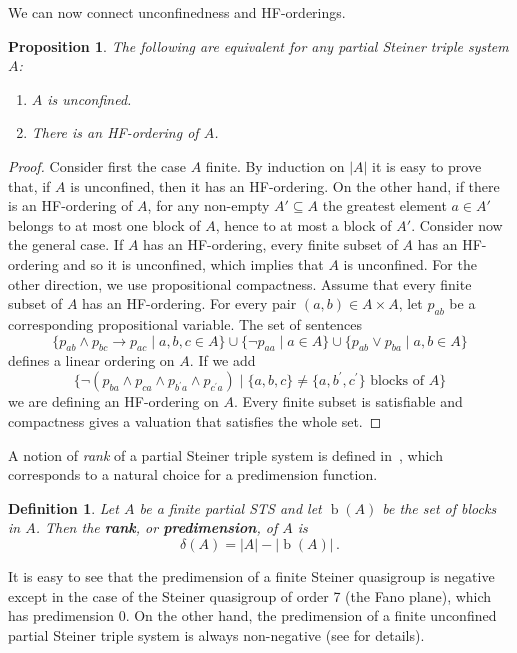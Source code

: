\documentclass[a4paper, 11pt]{article}
\DeclareMathOperator{\bl}{b}
\theoremstyle{note}
\newtheorem{df}[thm]{Definition}
\newtheorem{prop}[thm]{Proposition}
\begin{document}
We can now connect unconfinedness and HF-orderings.
			
\begin{prop}\label{2024_nov3} The following are equivalent for any partial Steiner triple system $A$:
\begin{enumerate}
\item $A$ is unconfined.
\item There is an HF-ordering of $A$.
\end{enumerate}	
\end{prop}	
\begin{proof} Consider first the case $A$ finite. By induction on $|A|$ it is easy to prove that, if $A$ is unconfined, then it has an HF-ordering. On the other hand, if there is an HF-ordering  of $A$, for any non-empty $A' \subseteq A$ the greatest element $a\in A'$ belongs to  at most one block of $A$, hence to at most a block of $A'$. Consider now the general case. If $A$ has an HF-ordering, every finite subset of $A$ has an HF-ordering and so it is unconfined, which implies that $A$ is unconfined. For the other direction, we use propositional compactness. Assume that every finite subset  of $A$ has an HF-ordering. For every pair  $(a,b)\in A\times A$, let $p_{ab}$ be a corresponding propositional variable. The set of sentences  
$$ \{p_{ab}\wedge p_{bc}\rightarrow p_{ac}\mid a,b,c\in A\}\cup \{\neg p_{aa}\mid a\in A\}\cup \{p_{ab}\vee p_{ba}\mid a,b\in A\}$$
 defines a linear ordering on $A$. If we add 
 $$\{\neg (p_{ba}\wedge p_{ca}\wedge p_{b^\prime a}\wedge p_{c^\prime a} )\mid \{a,b,c\}\neq\{a,b^\prime,c^\prime\} \text{ blocks of } A\}$$ 
 we are defining an HF-ordering on $A$. Every finite subset is satisfiable and compactness gives a valuation that satisfies the whole set.
\end{proof}
			
A notion of \textit{rank} of a partial Steiner triple system is defined in~\cite{sieben}, which corresponds to a natural choice for a predimension function.

\begin{df} Let $A$ be a finite partial STS and let $\bl(A)$ be the set of blocks in $A$. Then the \textbf{rank}, or \textbf{predimension}, of $A$ is
	\[ \delta(A)= |A|-|\bl(A)| \, .\]
\end{df}

It is easy to see that the predimension of a finite Steiner quasigroup is negative except in the case of the Steiner quasigroup of order 7 (the Fano plane), which has predimension 0. On the other hand, the predimension of a finite unconfined partial Steiner triple system is always non-negative (see \cite{barcas3} for details).
\end{document}

